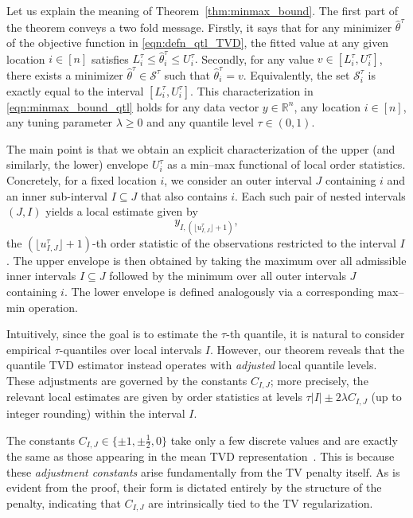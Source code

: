 \documentclass[11pt]{article}
\newcommand{\cS}{\mathcal{S}}
\newcommand{\bR}{\mathbb{R}}
\theoremstyle{plain}
\theoremstyle{definition}
\theoremstyle{remark}
\begin{document}
Let us explain the meaning of Theorem~\ref{thm:minmax_bound}. The first part of the theorem conveys a two fold message. Firstly, it says that for any minimizer $\hat{\theta}^{\tau}$ of the objective function in \eqref{eqn:defn_qtl_TVD}, the fitted value at any given location $i\in [n]$ satisfies $L^{\tau}_i \leq \hat{\theta}^{\tau}_i \leq  U^{\tau}_i.$ Secondly, for any value $v \in [L^{\tau}_i,U^{\tau}_i]$, there exists a minimizer $\hat{\theta}^{\tau}\in \cS^{\tau}$ such that $\hat{\theta}^{\tau}_i=v$. Equivalently, the set $\mathcal{S}^{\tau}_i$ is exactly equal to the interval $[L^{\tau}_i,U^{\tau}_i].$ This characterization in \eqref{eqn:minmax_bound_qtl} holds for any data vector $y\in \bR^n$, any location $i \in [n]$, any tuning parameter $\lambda\geq 0$ and any quantile level $\tau \in (0,1).$  



The main point is that we obtain an explicit characterization of the upper (and similarly, the lower) envelope $U_i^{\tau}$ as a min--max functional of local order statistics. Concretely, for a fixed location $i$, we consider an outer interval $J$ containing $i$ and an inner sub-interval $I \subseteq J$ that also contains $i$. Each such pair of nested intervals $(J,I)$ yields a local estimate given by
\[
y_{I,(\lfloor u^{\tau}_{I,J}\rfloor+1)},
\]
the $(\lfloor u^{\tau}_{I,J}\rfloor+1)$-th order statistic of the observations restricted to the interval $I$. The upper envelope is then obtained by taking the maximum over all admissible inner intervals $I \subseteq J$ followed by the minimum over all outer intervals $J$ containing $i$. The lower envelope is defined analogously via a corresponding max--min operation.

Intuitively, since the goal is to estimate the $\tau$-th quantile, it is natural to consider empirical $\tau$-quantiles over local intervals $I$. However, our theorem reveals that the quantile TVD estimator instead operates with \emph{adjusted} local quantile levels. These adjustments are governed by the constants $C_{I,J}$; more precisely, the relevant local estimates are given by order statistics at levels $\tau|I| \pm 2\lambda C_{I,J}$ (up to integer rounding) within the interval $I$.


The constants $C_{I,J} \in \{\pm 1, \pm \tfrac{1}{2}, 0\}$ take only a few discrete values and are exactly the same as those appearing in the mean TVD representation~\cite{chatterjee2026minmaxtrendfilteringgeneralizations}. This is because these \emph{adjustment constants} arise fundamentally from the TV penalty itself. As is evident from the proof, their form is dictated entirely by the structure of the penalty, indicating that $C_{I,J}$ are intrinsically tied to the TV regularization.
\end{document}
